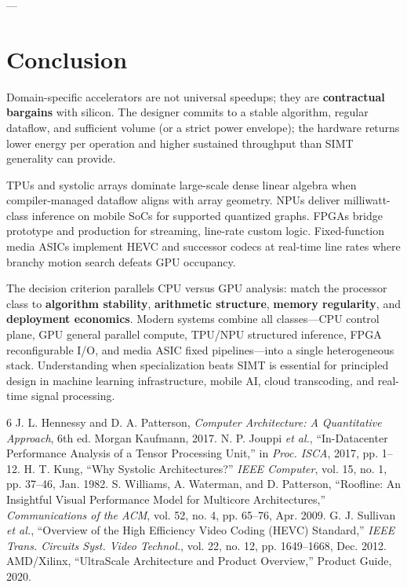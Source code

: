 \documentclass[11pt,journal,onecolumn]{IEEEtran}
\begin{document}
---

\section{Conclusion}
Domain-specific accelerators are not universal speedups; they are \textbf{contractual bargains} with silicon. The designer commits to a stable algorithm, regular dataflow, and sufficient volume (or a strict power envelope); the hardware returns lower energy per operation and higher sustained throughput than SIMT generality can provide.

TPUs and systolic arrays dominate large-scale dense linear algebra when compiler-managed dataflow aligns with array geometry. NPUs deliver milliwatt-class inference on mobile SoCs for supported quantized graphs. FPGAs bridge prototype and production for streaming, line-rate custom logic. Fixed-function media ASICs implement HEVC and successor codecs at real-time line rates where branchy motion search defeats GPU occupancy.

The decision criterion parallels CPU versus GPU analysis: match the processor class to \textbf{algorithm stability}, \textbf{arithmetic structure}, \textbf{memory regularity}, and \textbf{deployment economics}. Modern systems combine all classes---CPU control plane, GPU general parallel compute, TPU/NPU structured inference, FPGA reconfigurable I/O, and media ASIC fixed pipelines---into a single heterogeneous stack. Understanding when specialization beats SIMT is essential for principled design in machine learning infrastructure, mobile AI, cloud transcoding, and real-time signal processing.

\begin{thebibliography}{6}
J. L. Hennessy and D. A. Patterson, \textit{Computer Architecture: A Quantitative Approach}, 6th ed. Morgan Kaufmann, 2017.
N. P. Jouppi \textit{et al.}, ``In-Datacenter Performance Analysis of a Tensor Processing Unit,'' in \textit{Proc. ISCA}, 2017, pp. 1--12.
H. T. Kung, ``Why Systolic Architectures?'' \textit{IEEE Computer}, vol. 15, no. 1, pp. 37--46, Jan. 1982.
S. Williams, A. Waterman, and D. Patterson, ``Roofline: An Insightful Visual Performance Model for Multicore Architectures,'' \textit{Communications of the ACM}, vol. 52, no. 4, pp. 65--76, Apr. 2009.
G. J. Sullivan \textit{et al.}, ``Overview of the High Efficiency Video Coding (HEVC) Standard,'' \textit{IEEE Trans. Circuits Syst. Video Technol.}, vol. 22, no. 12, pp. 1649--1668, Dec. 2012.
AMD/Xilinx, ``UltraScale Architecture and Product Overview,'' Product Guide, 2020.
\end{thebibliography}
\end{document}
